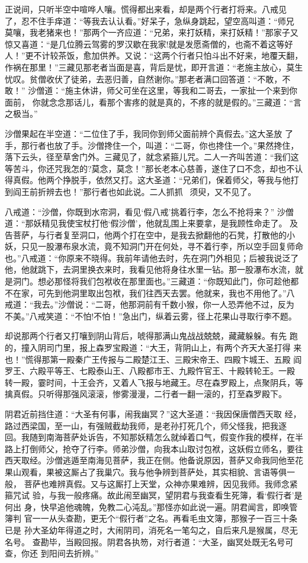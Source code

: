 正说间，只听半空中喧哗人嚷。慌得都出来看，却是两个行者打将来。八戒见
了，忍不住手痒道：“等我去认认看。”好呆子，急纵身跳起，望空高叫道：“师兄
莫嚷，我老猪来也！”那两个一齐应道：“兄弟，来打妖精，来打妖精！”那家子又
惊又喜道：“是几位腾云驾雾的罗汉歇在我家!就是发愿斋僧的，也斋不着这等好
人！”更不计较茶饭，愈加供养。又说：“这两个行者只怕斗出不好来，地覆天翻，
作祸在那里！”三藏见那老者当面是喜，背后是忧，即开言道：“老施主放心，莫生
忧叹。贫僧收伏了徒弟，去恶归善，自然谢你。”那老者满口回答道：“不敢，不敢！”
沙僧道：“施主休讲，师父可坐在这里，等我和二哥去，一家扯一个来到你面前，
你就念念那话儿，看那个害疼的就是真的，不疼的就是假的。”三藏道：“言之极当。”

沙僧果起在半空道：“二位住了手，我同你到师父面前辨个真假去。”这大圣放
了手，那行者也放了手。沙僧搀住一个，叫道：“二哥，你也搀住一个。”果然搀住，
落下云头，径至草舍门外。三藏见了，就念紧箍儿咒。二人一齐叫苦道：“我们这
等苦斗，你还咒我怎的?莫念，莫念！”那长老本心慈善，遂住了口不念，却也不认
得真假。他两个挣脱手，依然又打。这大圣道：“兄弟们，保着师父，等我与他打
到阎王前折辨去也！”那行者也如此说。二人抓抓，须臾，又不见了。

八戒道：“沙僧，你既到水帘洞，看见‘假八戒’挑着行李，怎么不抢将来？”
沙僧道：“那妖精见我使宝杖打他‘假沙僧’，他就乱围上来要拿，是我顾性命走了。
及告菩萨，与行者复至洞口，他两个打在空中，是我去掀翻他的石凳，打散他的小
妖，只见一股瀑布泉水流，竟不知洞门开在何处，寻不着行李，所以空手回复师命
也。”八戒道：“你原来不晓得。我前年请他去时，先在洞门外相见；后被我说泛了
他，他就跳下，去洞里换衣来时，我看见他将身往水里一钻。那一股瀑布水流，就
是洞门。想必那怪将我们包袱收在那里面也。”三藏道：“你既知此门，你可趁他都
不在家，可先到他洞里取出包袱，我们往西天去罢。他就来，我也不用他了。”八
戒道：“我去。”沙僧说：“二哥，他那洞前有千数小猴，你一人恐弄他不过，反为
不美。”八戒笑道：“不怕!不怕！”急出门，纵着云雾，径上花果山寻取行李不题。

却说那两个行者又打嚷到阴山背后，唬得那满山鬼战战兢兢，藏藏躲躲。有先
跑的，撞入阴司门里，报上森罗宝殿道：“大王，背阴山上，有两个齐天大圣打得
来也！”慌得那第一殿秦广王传报与二殿楚江王、三殿宋帝王、四殿卞城王、五殿
阎罗王、六殿平等王、七殿泰山王、八殿都市王、九殿忤官王、十殿转轮王。一殿
转一殿，霎时间，十王会齐，又着人飞报与地藏王。尽在森罗殿上，点聚阴兵，等
擒真假。只听得那强风滚滚，惨雾漫漫，二行者一翻一滚的，打至森罗殿下。

阴君近前挡住道：“大圣有何事，闹我幽冥？”这大圣道：“我因保唐僧西天取
经，路过西梁国，至一山，有强贼截劫我师，是老孙打死几个，师父怪我，把我逐
回。我随到南海菩萨处诉告，不知那妖精怎么就绰着口气，假变作我的模样，在半
路上打倒师父，抢夺了行李。师弟沙僧，向我本山取讨包袱，这妖假立师名，要往
西天取经。沙僧逃遁至南海见菩萨，我正在侧。他备说原因，菩萨又命我同他至花
果山观看，果被这厮占了我巢穴。我与他争辨到菩萨处，其实相貌、言语等俱一般，
菩萨也难辨真假。又与这厮打上天堂，众神亦果难辨，因见我师。我师念紧箍咒试
验，与我一般疼痛。故此闹至幽冥，望阴君与我查看生死簿，看‘假行者’是何出
身，快早追他魂魄，免教二心沌乱。”那怪亦如此说一遍。阴君闻言，即唤管簿判
官一一从头查勘，更无个“假行者”之名。再看毛虫文簿，那猴子一百三十条已是
孙大圣幼年得道之时，大闹阴司，消死名一笔勾之，自后来凡是猴属，尽无名号。
查勘毕，当殿回报。阴君各执笏，对行者道：“大圣，幽冥处既无名号可查，你还
到阳间去折辨。”

